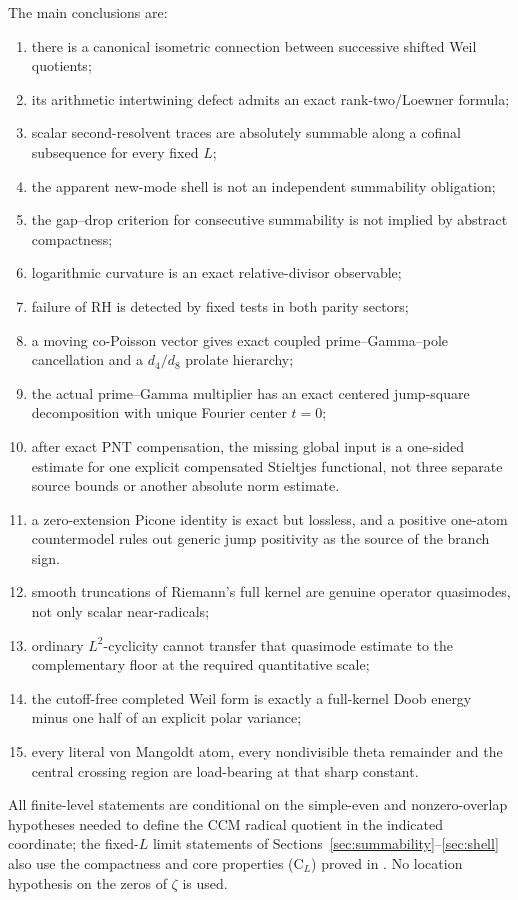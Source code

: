 \documentclass[11pt]{amsart}
\theoremstyle{definition}
\theoremstyle{remark}
\begin{document}
The main conclusions are:
\begin{enumerate}
\item there is a canonical isometric connection between successive shifted
Weil quotients;
\item its arithmetic intertwining defect admits an exact rank-two/Loewner
formula;
\item scalar second-resolvent traces are absolutely summable along a cofinal
subsequence for every fixed \(L\);
\item the apparent new-mode shell is not an independent summability
obligation;
\item the gap--drop criterion for consecutive summability is not implied by
abstract compactness;
\item logarithmic curvature is an exact relative-divisor observable;
\item failure of RH is detected by fixed tests in both parity sectors;
\item a moving co-Poisson vector gives exact coupled
prime--Gamma--pole cancellation and a \(d_4/d_8\) prolate hierarchy;
\item the actual prime--Gamma multiplier has an exact centered jump-square
decomposition with unique Fourier center \(t=0\);
\item after exact PNT compensation, the missing global input is a one-sided
estimate for one explicit compensated Stieltjes functional, not three
separate source bounds or another absolute norm estimate.
\item a zero-extension Picone identity is exact but lossless, and a
positive one-atom countermodel rules out generic jump positivity as the
source of the branch sign.
\item smooth truncations of Riemann's full kernel are genuine operator
quasimodes, not only scalar near-radicals;
\item ordinary \(L^2\)-cyclicity cannot transfer that quasimode estimate to
the complementary floor at the required quantitative scale;
\item the cutoff-free completed Weil form is exactly a full-kernel
Doob energy minus one half of an explicit polar variance;
\item every literal von Mangoldt atom, every nondivisible theta remainder
and the central crossing region are load-bearing at that sharp constant.
\end{enumerate}

All finite-level statements are conditional on the simple-even and
nonzero-overlap hypotheses needed to define the CCM radical quotient in the
indicated coordinate; the fixed-\(L\) limit statements of
Sections~\ref{sec:summability}--\ref{sec:shell} also use the compactness and core properties
\textup{(C\(_L\))} proved in \cite{CCM}.  No location hypothesis on
the zeros of \(\zeta\) is used.
\end{document}
